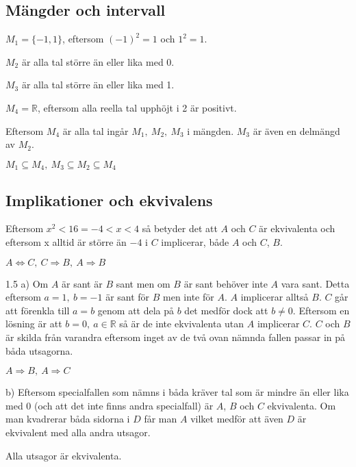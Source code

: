 \subsection*{Mängder och intervall}

\begin{task}{1.3}
	$M_1=\{-1,1\}$, eftersom $(-1)^2=1$ och $1^2=1$.
	
	$M_2$ är alla tal större än eller lika med 0.
	
	$M_3$ är alla tal större än eller lika med 1.
	
	$M_4=\mathbb{R}$, eftersom alla reella tal upphöjt i 2 är positivt.
	
	Eftersom $M_4$ är alla tal ingår $M_1,~M_2,~M_3$ i mängden. $M_3$ är även en delmängd av $M_2$.
	
	\ans $M_1 \subseteq M_4,~ M_3 \subseteq M_2 \subseteq M_4$
\end{task}

\subsection*{Implikationer och ekvivalens}

\begin{task}{1.4}
	Eftersom $x^2<16 = -4<x<4$ så betyder det att $A$ och $C$ är ekvivalenta och
	eftersom x alltid är större än $-4$ i $C$ implicerar, både $A$ och $C$, $B$.
	
	\ans $A \Leftrightarrow C,~ C \Rightarrow B,~ A \Rightarrow B$
\end{task}

\begin{task}{1.5 a)}
	Om $A$ är sant är $B$ sant men om $B$ är sant behöver inte $A$ vara sant. Detta eftersom $a=1,~b=-1$ är sant för $B$ men inte för $A$. $A$ implicerar alltså $B$. $C$ går att förenkla till $a=b$ genom att dela på $b$ det medför dock att $b\neq0$. Eftersom en lösning är att $b=0,~a\in\mathbb{R}$ så är de inte ekvivalenta utan $A$ implicerar $C$. $C$ och $B$ är skilda från varandra eftersom inget av de två ovan nämnda fallen passar in på båda utsagorna. 
	
	\ans $A \Rightarrow B,~ A \Rightarrow C$
\end{task}

\begin{task}{b)}
	Eftersom specialfallen som nämns i  båda kräver tal som är mindre än eller lika med 0 (och att det inte finns andra specialfall) är $A$, $B$ och $C$ ekvivalenta. Om man kvadrerar båda sidorna i $D$ får man $A$ vilket medför att även $D$ är ekvivalent med alla andra utsagor.
	
	\ans Alla utsagor är ekvivalenta.
\end{task}


